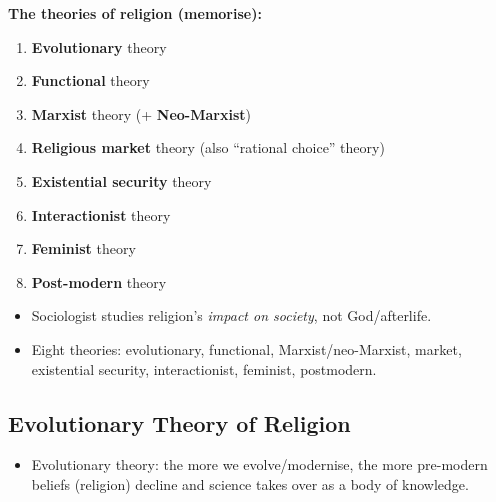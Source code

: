 \begin{DataFact}
\textbf{The theories of religion (memorise):}
\begin{enumerate}
\item \textbf{Evolutionary} theory
\item \textbf{Functional} theory
\item \textbf{Marxist} theory (+ \textbf{Neo-Marxist})
\item \textbf{Religious market} theory (also ``rational choice'' theory)
\item \textbf{Existential security} theory
\item \textbf{Interactionist} theory
\item \textbf{Feminist} theory
\item \textbf{Post-modern} theory
\end{enumerate}
\end{DataFact}

\begin{QuickRevision}
\begin{itemize}
\item Sociologist studies religion's \textit{impact on society}, not God/afterlife.
\item Eight theories: evolutionary, functional, Marxist/neo-Marxist, market, existential security, interactionist, feminist, postmodern.
\end{itemize}
\end{QuickRevision}

\sectiondivider

\subsection{Evolutionary Theory of Religion}

\begin{KeyConcept}
\begin{itemize}
\item Evolutionary theory: the more we evolve/modernise, the more pre-modern beliefs (religion) decline and science takes over as a body of knowledge.
\end{itemize}
\end{KeyConcept}

